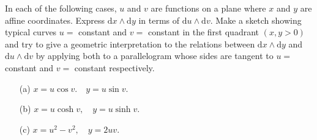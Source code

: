 \documentclass[a4paper, 12pt]{article}
\begin{document}
\begin{problem} 
In each of the following cases, $u$ and $v$ are functions on a plane where $x$ and $y$ are affine coordinates. Express $\mathrm{d} x \wedge \mathrm{d} y$ in terms of $\mathrm{d} u \wedge \mathrm{d} v$. Make a sketch showing typical curves $u=$ constant and $v=$ constant in the first quadrant $(x, y>0)$ and try to give a geometric interpretation to the relations between $\mathrm{d} x \wedge \mathrm{d} y$ and $\mathrm{d} u \wedge \mathrm{d} v$ by applying both to a parallelogram whose sides are tangent to $u=$ constant and $v=$ constant respectively.
\begin{enumerate}
    \item[(a)] $x=u \cos v . \quad y=u \sin v$.
    \item[(b)] $x=u \cosh v, \quad y=u \sinh v$.
    \item[(c)] $x=u^2-v^2, \quad y=2 u v$.
\end{enumerate}

\end{problem}
\end{document}

